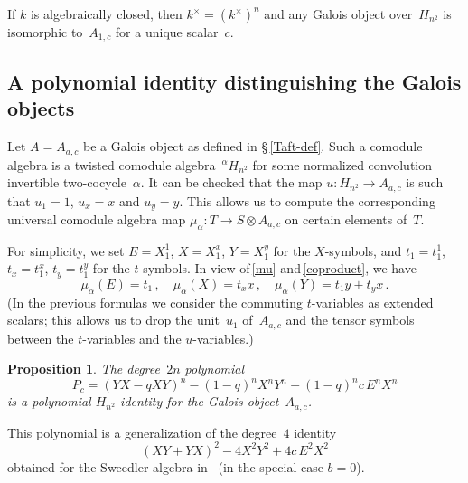 \documentclass[11pt, a4paper]{amsart}
\newtheorem{prop}[theorem]{Proposition}
\theoremstyle{definition}
\numberwithin{equation}{section}
\begin{document}
If $k$ is algebraically closed, then $k^{\times} = (k^{\times})^n$
and any Galois object over~$H_{n^2}$ is isomorphic to~$A_{1,c}$ for a unique scalar~$c$.

\subsection{A polynomial identity distinguishing the Galois objects}\label{Taft-PI}

Let $A = A_{a,c}$ be a Galois object as defined in \S\,\ref{Taft-def}.
Such a comodule algebra is a twisted comodule algebra~${}^{\alpha} H_{n^2}$ for some 
normalized convolution invertible two-cocycle~$\alpha$. 
It can be checked that the map $u: H_{n^2} \to A_{a,c}$ is such that $u_1 = 1$, $u_x = x$ and $u_y = y$.
This allows us to compute the corresponding universal comodule algebra map
$\mu_{\alpha} : T \to S \otimes A_{a,c}$ on certain elements of~$T$.

For simplicity, we set 
$E = X_1^1$, $X= X_1^x$, $Y= X_1^y$ for the $X$-symbols, and 
$t_1 = t_1^1$, $t_x= t_1^x$, $t_y= t_1^y$ for the $t$-symbols. 
In view of\,\eqref{mu} and\,\eqref{coproduct},
we have
\begin{equation}\label{mu-Taft}
\mu_{\alpha}(E) = t_1 \, , \quad \mu_{\alpha}(X) = t_x x\, , \quad \mu_{\alpha}(Y) = t_1 y + t_y x \, .
\end{equation}
(In the previous formulas we consider the commuting $t$-variables as extended scalars;
this allows us to drop the unit~$u_1$ of~$A_{a,c}$ and the tensor symbols between the $t$-variables 
and the $u$-variables.)

\begin{prop}\label{mainth}
The degree~$2n$ polynomial
\[
P_c = (YX - qXY)^n - (1-q)^n X^nY^n +  (1-q)^n c \,  E^nX^n 
\]
is a polynomial $H_{n^2}$-identity for the Galois object~$A_{a,c}$.
\end{prop}

This polynomial is a generalization of the degree~$4$ identity
\[
(XY+YX)^2 - 4 X^2 Y^2 + 4c\, E^2 X^2
\]
obtained for the Sweedler algebra in~\cite[Cor.\,10.4]{AK}
(in the special case $b=0$).
\end{document}
